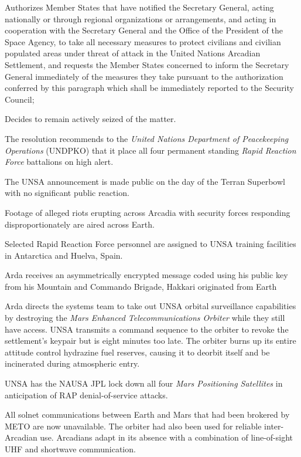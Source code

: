 \item Authorizes Member States that have notified the Secretary General, acting nationally or through regional organizations or arrangements, and acting in cooperation with the Secretary General and the Office of the President of the Space Agency, to take all necessary measures to protect civilians and civilian populated areas under threat of attack in the United Nations Arcadian Settlement, and requests the Member States concerned to inform the Secretary General immediately of the measures they take pursuant to the authorization conferred by this paragraph which shall be immediately reported to the Security Council;

\item Decides to remain actively seized of the matter.
\stopitemize
\stopTimelineDocument

The resolution recommends to the {\it United Nations Department of Peacekeeping Operations} (UNDPKO) that it place all four permanent standing {\it Rapid Reaction Force} battalions on high alert.

The UNSA announcement is made public on the day of the Terran Superbowl with no significant public reaction.
\StopTimelineDate

Footage of alleged riots erupting across Arcadia with security forces responding disproportionately are aired across Earth.
\StopTimelineDate

Selected Rapid Reaction Force personnel are assigned to UNSA training facilities in Antarctica and Huelva, Spain.
\StopTimelineDate

Arda receives an asymmetrically encrypted message coded using his public key from his Mountain and Commando Brigade, Hakkari originated from Earth
\StopTimelineDate

Arda directs the systems team to take out UNSA orbital surveillance capabilities by destroying the {\it Mars Enhanced Telecommunications Orbiter} while they still have access. UNSA transmits a command sequence to the orbiter to revoke the settlement's keypair but is eight minutes too late. The orbiter burns up its entire attitude control hydrazine fuel reserves, causing it to deorbit itself and be incinerated during atmospheric entry. 

UNSA has the NAUSA JPL lock down all four {\it Mars Positioning Satellites} in anticipation of RAP denial-of-service attacks.

All solnet communications between Earth and Mars that had been brokered by METO are now unavailable. The orbiter had also been used for reliable inter-Arcadian use. Arcadians adapt in its absence with a combination of line-of-sight UHF and shortwave communication.
\StopTimelineDate

